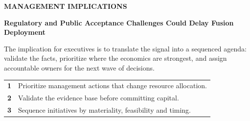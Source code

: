 \documentclass[10pt,a4paper]{article}
\begin{document}
\clearpage
{\textcolor{BOBlue}{\scriptsize\bfseries MANAGEMENT IMPLICATIONS}}\par\vspace{-1pt}
{\Large\sffamily\bfseries\color{BONavy} Regulatory and Public Acceptance Challenges Could Delay Fusion Deployment}\par\vspace{4pt}
{\small The implication for executives is to translate the signal into a sequenced agenda: validate the facts, prioritize where the economics are strongest, and assign accountable owners for the next wave of decisions.}\par
\begin{tabularx}{\linewidth}{p{10mm}Y}
\textcolor{BOBlue}{\bfseries 1} & Prioritize management actions that change resource allocation. \\[5pt]
\textcolor{BOBlue}{\bfseries 2} & Validate the evidence base before committing capital. \\[5pt]
\textcolor{BOBlue}{\bfseries 3} & Sequence initiatives by materiality, feasibility and timing. \\[5pt]
\end{tabularx}
\vspace{6pt}

\vspace{6pt}{\textcolor{BOBlue}{\scriptsize\bfseries EXECUTION ROADMAP}}\par
\begin{center}
\end{center}
\end{document}
